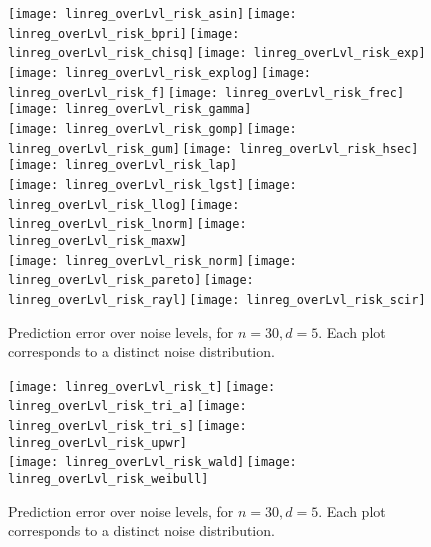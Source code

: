 \documentclass[11pt,oneside]{article}
\theoremstyle{definition} \newtheorem{defn}{Definition}       %
\theoremstyle{plain} \newtheorem{prop}[defn]{Proposition}           %
\theoremstyle{plain} \newtheorem{thm}[defn]{Theorem}                %
\theoremstyle{plain} \newtheorem{lem}[defn]{Lemma}                  %
\theoremstyle{plain} \newtheorem{cor}[defn]{Corollary}              %
\theoremstyle{remark} \newtheorem{rmk}[defn]{Remark}                %
\theoremstyle{remark} \newtheorem{ex}[defn]{Example}                %
\begin{document}
\clearpage


\begin{figure}[t]
\centering
\texttt{[image: linreg\_overLvl\_risk\_asin]}\,\texttt{[image: linreg\_overLvl\_risk\_bpri]}\,\texttt{[image: linreg\_overLvl\_risk\_chisq]}\,\texttt{[image: linreg\_overLvl\_risk\_exp]}\\
\texttt{[image: linreg\_overLvl\_risk\_explog]}\,\texttt{[image: linreg\_overLvl\_risk\_f]}\,\texttt{[image: linreg\_overLvl\_risk\_frec]}\,\texttt{[image: linreg\_overLvl\_risk\_gamma]}\\
\texttt{[image: linreg\_overLvl\_risk\_gomp]}\,\texttt{[image: linreg\_overLvl\_risk\_gum]}\,\texttt{[image: linreg\_overLvl\_risk\_hsec]}\,\texttt{[image: linreg\_overLvl\_risk\_lap]}\\
\texttt{[image: linreg\_overLvl\_risk\_lgst]}\,\texttt{[image: linreg\_overLvl\_risk\_llog]}\,\texttt{[image: linreg\_overLvl\_risk\_lnorm]}\,\texttt{[image: linreg\_overLvl\_risk\_maxw]}\\
\texttt{[image: linreg\_overLvl\_risk\_norm]}\,\texttt{[image: linreg\_overLvl\_risk\_pareto]}\,\texttt{[image: linreg\_overLvl\_risk\_rayl]}\,\texttt{[image: linreg\_overLvl\_risk\_scir]}
\caption{Prediction error over noise levels, for $n=30, d=5$. Each plot corresponds to a distinct noise distribution.}
\label{fig:overLvl_all_distros_1}
\end{figure}

\clearpage

\begin{figure}[t]
\centering
\texttt{[image: linreg\_overLvl\_risk\_t]}\,\texttt{[image: linreg\_overLvl\_risk\_tri\_a]}\,\texttt{[image: linreg\_overLvl\_risk\_tri\_s]}\,\texttt{[image: linreg\_overLvl\_risk\_upwr]}\\
\texttt{[image: linreg\_overLvl\_risk\_wald]}\,\texttt{[image: linreg\_overLvl\_risk\_weibull]}
\caption{Prediction error over noise levels, for $n=30, d=5$. Each plot corresponds to a distinct noise distribution.}
\label{fig:overLvl_all_distros_2}
\end{figure}
\end{document}
